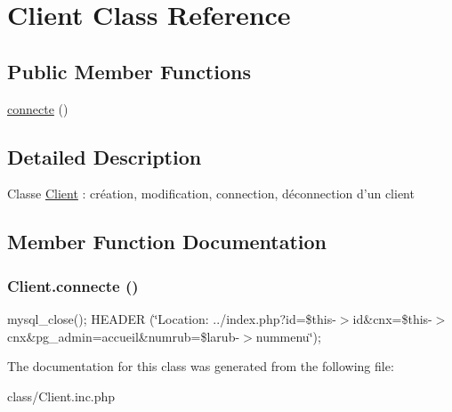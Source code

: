 \hypertarget{class_client}{
\section{Client Class Reference}
\label{class_client}
}
\subsection*{Public Member Functions}
\begin{DoxyCompactItemize}
\item 
\hyperlink{class_client_ab34c41ffa0429a22f2e50daab567d5d5}{connecte} ()
\end{DoxyCompactItemize}


\subsection{Detailed Description}
Classe \hyperlink{class_client}{Client} : création, modification, connection, déconnection d'un client 

\subsection{Member Function Documentation}
\hypertarget{class_client_ab34c41ffa0429a22f2e50daab567d5d5}{
\subsubsection[{connecte}]{\setlength{\rightskip}{0pt plus 5cm}Client.connecte ()}}
\label{class_client_ab34c41ffa0429a22f2e50daab567d5d5}


mysql\_\-close(); HEADER (\char`\"{}Location: ../index.php?id=\$this-\/$>$id\&cnx=\$this-\/$>$cnx\&pg\_\-admin=accueil\&numrub=\$larub-\/$>$nummenu\char`\"{}); 

The documentation for this class was generated from the following file:\begin{DoxyCompactItemize}
\item 
class/Client.inc.php\end{DoxyCompactItemize}
